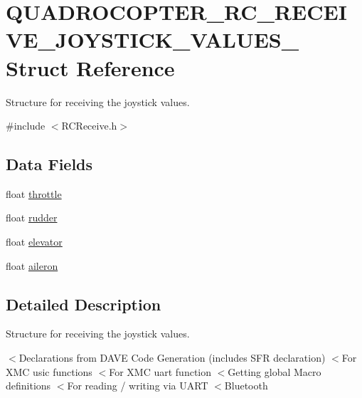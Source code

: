 \hypertarget{struct_q_u_a_d_r_o_c_o_p_t_e_r___r_c___r_e_c_e_i_v_e___j_o_y_s_t_i_c_k___v_a_l_u_e_s__}{}\section{Q\+U\+A\+D\+R\+O\+C\+O\+P\+T\+E\+R\+\_\+\+R\+C\+\_\+\+R\+E\+C\+E\+I\+V\+E\+\_\+\+J\+O\+Y\+S\+T\+I\+C\+K\+\_\+\+V\+A\+L\+U\+E\+S\+\_\+ Struct Reference}
\label{struct_q_u_a_d_r_o_c_o_p_t_e_r___r_c___r_e_c_e_i_v_e___j_o_y_s_t_i_c_k___v_a_l_u_e_s__}


Structure for receiving the joystick values.  




{\ttfamily \#include $<$R\+C\+Receive.\+h$>$}

\subsection*{Data Fields}
\begin{DoxyCompactItemize}
\item 
float \hyperlink{struct_q_u_a_d_r_o_c_o_p_t_e_r___r_c___r_e_c_e_i_v_e___j_o_y_s_t_i_c_k___v_a_l_u_e_s___a5d7ec5f69a09aed6b1dc342b82ab07ff}{throttle}
\item 
float \hyperlink{struct_q_u_a_d_r_o_c_o_p_t_e_r___r_c___r_e_c_e_i_v_e___j_o_y_s_t_i_c_k___v_a_l_u_e_s___a7ca788c293727de925931fd07b27db49}{rudder}
\item 
float \hyperlink{struct_q_u_a_d_r_o_c_o_p_t_e_r___r_c___r_e_c_e_i_v_e___j_o_y_s_t_i_c_k___v_a_l_u_e_s___a0ed2cf6222820acc0564e796ddb716b9}{elevator}
\item 
float \hyperlink{struct_q_u_a_d_r_o_c_o_p_t_e_r___r_c___r_e_c_e_i_v_e___j_o_y_s_t_i_c_k___v_a_l_u_e_s___a173314add25e78edf688ec57495b4fce}{aileron}
\end{DoxyCompactItemize}


\subsection{Detailed Description}
Structure for receiving the joystick values. 

$<$Declarations from D\+A\+VE Code Generation (includes S\+FR declaration) $<$For X\+MC usic functions $<$For X\+MC uart function $<$Getting global Macro definitions $<$For reading / writing via U\+A\+RT $<$Bluetooth 

